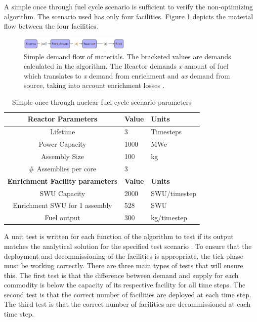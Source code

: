 \documentclass{anstrans}
\begin{document}
A simple once through fuel cycle scenario is sufficient to verify the non-optimizing algorithm. The scenario used has only four facilities. Figure \ref{fig:materialflow} depicts the material flow between the four facilities.   
\begin{figure}[ht] %
	\centering
	\includegraphics[width=0.48\textwidth]{materialflow}
	\caption{Simple demand flow of materials. The bracketed values are demands calculated in the algorithm. The Reactor demands \textit{x} amount of fuel which translates to \textit{x} demand from enrichment and \textit{ax} demand from source, taking into account enrichment losses \cite{bae_numerical_2018}.}
	\label{fig:materialflow}
\end{figure}

\begin{table}[h]
	\centering
	\begin{tabularx}{0.5\textwidth}{cff}
		\hline
		\textbf{Reactor Parameters} & \textbf{Value} & \textbf{Units} \\
		\hline
		Lifetime & 3 & Timesteps \\ 
		Power Capacity & 1000 & MWe \\
		Assembly Size & 100 & kg \\
		\# Assemblies per core & 3 & \\
		\hline
		\textbf{Enrichment Facility parameters} & \textbf{Value} & \textbf{Units} \\
		\hline 
		SWU Capacity & 2000 & SWU/timestep \\
		Enrichment SWU for 1 assembly & 528 & SWU \\
		Fuel output & 300 & kg/timestep \\
		\hline
	\end{tabularx}
	\caption {Simple once through nuclear fuel cycle scenario parameters \cite{bae_numerical_2018}}
	\label{tab:parameters}
\end{table}


A unit test is written for each function of the algorithm to test if its output matches the analytical solution for the specified test scenario \cite{bae_numerical_2018}. To ensure that the deployment and decommissioning of the facilities is appropriate, the tick phase must be working correctly. There are three main types of tests that will ensure this. The first test is that the difference between demand and supply for each commodity is below the capacity of its respective facility for all time steps. The second test is that the correct number of facilities are deployed at each time step. The third test is that the correct number of facilities are decommissioned at each time step.  
\end{document}

